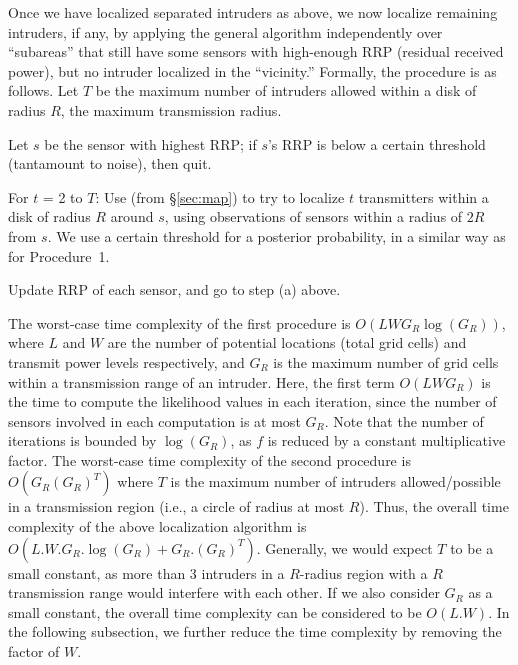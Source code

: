   Once we
have localized separated intruders as above, we now localize remaining
intruders, if any, by applying the general \map algorithm
independently over ``subareas'' that still have some sensors with
high-enough RRP (residual received power), but no intruder localized
in the ``vicinity.'' Formally, the procedure is as follows. Let $T$ be
the maximum number of intruders allowed within a disk of radius $R$,
the maximum transmission radius.

\begin{packedalpha}
 \item
Let $s$ be the sensor with highest RRP; if $s$'s RRP is below a
certain threshold (tantamount to noise), then quit.

\item
For $t$ = 2 to $T$: Use \map (from \S\ref{sec:map}) to try to localize
$t$ transmitters within a disk of radius $R$ around $s$, using
observations of sensors within a radius of $2R$ from $s$. We use a
certain threshold for a posterior probability, in a similar way as for
Procedure~1.

\item
Update RRP of each sensor, and go to step (a) above.
\end{packedalpha}

 The worst-case time complexity of the first
procedure is $O(LWG_R\log(G_R))$, where $L$ and $W$ are the number
of potential locations (total grid cells) and transmit power levels
respectively, and $G_R$ is the maximum number of grid cells within a
transmission range of an intruder.
Here, the first term $O(LWG_R)$ is the time to compute the likelihood
values in each iteration, since the number of sensors involved in each
computation is at most $G_R$. Note that the number of iterations is
bounded by $\log(G_R)$, as $f$ is reduced by a constant multiplicative
factor.
The worst-case time complexity of the second procedure is
$O(G_R(G_R)^T)$ where $T$ is the maximum number of intruders
allowed/possible in a transmission region (i.e., a circle of radius at
most $R$).
Thus, the overall time complexity of the above localization algorithm
is $O(L.W.G_R.\log(G_R) + G_R.(G_R)^T)$.
Generally, we would expect $T$ to be a small constant, as more than 3
intruders in a $R$-radius region with a $R$ transmission range would
interfere with each other. If we also consider $G_R$ as a small
constant, the overall time complexity can be considered to be
$O(L.W)$.  In the following subsection, we further reduce the time
complexity by removing the factor of $W$.

